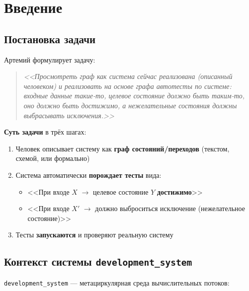 \documentclass[12pt, a4paper, twoside]{article}
\begin{document}
\tableofcontents
\newpage

\section{Введение}

\subsection{Постановка задачи}

Артемий формулирует задачу:

\begin{quote}
\itshape
<<Просмотреть граф как система сейчас реализована (описанный человеком) и
реализовать на основе графа автотесты по системе: входные данные такие-то,
целевое состояние должно быть таким-то, оно должно быть достижимо,
а нежелательные состояния должны выбрасывать исключения.>>
\end{quote}

\textbf{Суть задачи} в трёх шагах:

\begin{enumerate}[leftmargin=1.5em]
  \item Человек описывает систему как \textbf{граф состояний/переходов}
        (текстом, схемой, или формально)
  \item Система автоматически \textbf{порождает тесты} вида:
  \begin{itemize}
    \item <<При входе $X$ $\to$ целевое состояние $Y$ \textbf{достижимо}>>
    \item <<При входе $X'$ $\to$ должно выброситься исключение (нежелательное состояние)>>
  \end{itemize}
  \item Тесты \textbf{запускаются} и проверяют реальную систему
\end{enumerate}

\subsection{Контекст системы \texttt{development\_system}}

\texttt{development\_system} --- метациркулярная среда вычислительных потоков:
\end{document}
